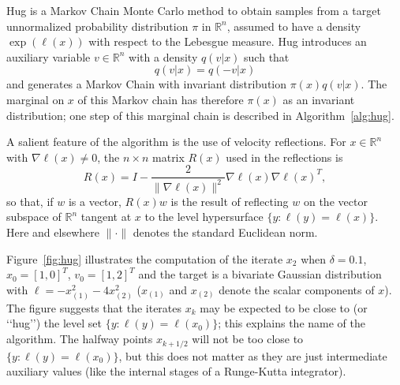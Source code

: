 \documentclass[10pt]{article}
\newcommand{\bbR}{\mathbb R}
\begin{document}
Hug is a Markov Chain Monte Carlo method to obtain samples from a target unnormalized probability distribution \(\pi\) in \(\bbR^n\), assumed
to have a density \(\exp(\ell(x))\) with respect to the Lebesgue measure. Hug introduces an auxiliary variable \(v\in\bbR^n\) with a density \(q(v|x)\) such that
\begin{equation}\label{eq:qreversible}
q(v|x)=q(-v|x)
\end{equation}
and generates a Markov Chain with invariant distribution \(\pi(x)q(v|x)\). The marginal on \(x\) of this Markov chain has therefore \(\pi(x)\) as an invariant distribution;  one step of this marginal chain is described in Algorithm~\ref{alg:hug}.

A salient feature of the algorithm is the use of velocity reflections. For \(x\in\bbR^n\) with \(\nabla\ell(x)\neq 0\), the \(n\times n\) matrix \(R(x)\) used in the reflections is
\begin{equation}\label{eq:R}
R(x) = I-\frac{2}{\| \nabla \ell(x)\|^2} \nabla \ell(x) \nabla \ell(x)^T,
\end{equation}
so that, if \(w\) is a vector, \(R(x)w\) is the result of reflecting \(w\) on the vector subspace of \(\bbR^n\) tangent at \(x\) to the level hypersurface \(\{y:\ell(y)=\ell(x)\}\). Here and elsewhere \(\|\cdot\|\) denotes the standard Euclidean norm.


Figure~\ref{fig:hug} illustrates the computation of the iterate \(x_2\) when \(\delta=0.1\), \(x_0=[1,0]^T\), \(v_0=[1,2]^T\) and the target is a bivariate Gaussian distribution with
\(\ell = -x_{(1)}^2-4x_{(2)}^2\) (\(x_{(1)}\) and \(x_{(2)}\) denote the scalar components of \(x\)).  The figure suggests that  the iterates \(x_k\) may be expected  to be close to (or \lq\lq hug\rq\rq)  the level set \(\{y:\ell(y)=\ell(x_0)\}\); this explains the name of the algorithm. The  halfway points \(x_{k+1/2}\) will not be too close to \(\{y:\ell(y)=\ell(x_0)\}\), but this does not matter as they are just intermediate auxiliary values (like the internal stages of a Runge-Kutta integrator).
\end{document}
